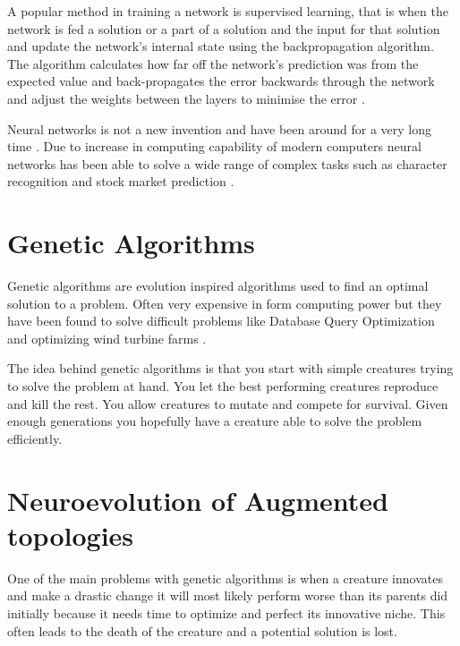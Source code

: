 \documentclass{kththesis}
\begin{document}
A popular method in training a network is supervised learning, that is when the network is fed a solution or a part of a solution and the input for that solution and update the network's internal state using the backpropagation algorithm. The algorithm calculates how far off the network’s prediction was from the expected value and back-propagates the error backwards through the network and adjust the weights between the layers to minimise the error \parencite{BackProp}\parencite{Applications_backpropagation}.
 
Neural networks is not a new invention and have been around for a very long time \parencite{NNHistory}. Due to increase in computing capability of modern computers neural networks has been able to solve a wide range of complex tasks such as character recognition and stock market prediction \parencite{NNHistory2}.
 
 
\section{Genetic Algorithms}
Genetic algorithms are evolution inspired algorithms used to find an optimal solution to a problem. Often very expensive in form computing power but they have been found to solve difficult problems like Database Query Optimization \parencite{bennett1991genetic} and optimizing wind turbine farms \parencite{mosetti1994optimization}.
 
The idea behind genetic algorithms is that you start with simple creatures trying to solve the problem at hand. You let the best performing creatures reproduce and kill the rest. You allow creatures to mutate and compete for survival. Given enough generations you hopefully have a creature able to solve the problem efficiently.
 
 
\section{Neuroevolution of Augmented topologies}
One of the main problems with genetic algorithms is when a creature innovates and make a drastic change it will most likely perform worse than its parents did initially because it needs time to optimize and perfect its innovative niche. This often leads to the death of the creature and a potential solution is lost.
 
\end{document}
